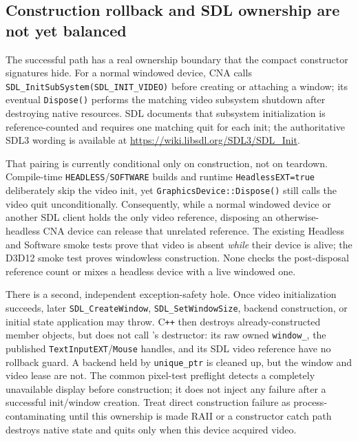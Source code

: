 \subsection{Construction rollback and SDL ownership are not yet balanced}

The successful path has a real ownership boundary that the compact constructor signatures hide.
For a normal windowed device, CNA calls
\texttt{SDL\_Init\allowbreak{}SubSystem(}\allowbreak{}\texttt{SDL\_INIT\_VIDEO)} before
creating or attaching a window; its eventual \texttt{Dispose()} performs the matching video
subsystem shutdown after destroying native resources. SDL documents
that subsystem initialization is reference-counted and requires one matching quit for each init;
the authoritative SDL3 wording is available at
\url{https://wiki.libsdl.org/SDL3/SDL_Init}.

That pairing is currently conditional only on construction, not on teardown. Compile-time
\texttt{HEADLESS}/\texttt{SOFTWARE} builds and runtime \texttt{HeadlessEXT=true} deliberately
skip the video init, yet \texttt{GraphicsDevice::Dispose()} still calls the video quit
unconditionally. Consequently, while a normal windowed device or another SDL client holds the
only video reference, disposing an otherwise-headless CNA device can release that unrelated
reference. The existing Headless and Software smoke tests prove that video is absent \emph{while}
their device is alive; the D3D12 smoke test proves windowless construction. None checks the
post-disposal reference count or mixes a headless device with a live windowed one.

There is a second, independent exception-safety hole. Once video initialization succeeds, later
\texttt{SDL\_CreateWindow}, \texttt{SDL\_SetWindowSize}, backend construction, or initial
state application may throw. C\texttt{++} then destroys already-constructed member objects, but
does not call 's destructor: its raw owned \texttt{window\_}, the
published \texttt{TextInputEXT}/\texttt{Mouse} handles, and its SDL video reference have no
rollback guard. A backend held by \texttt{unique\_ptr} is cleaned up, but the window and video
lease are not. The common pixel-test preflight detects a completely unavailable display before
construction; it does not inject any failure after a successful init/window creation. Treat
direct construction failure as process-contaminating until this ownership is made RAII or a
constructor catch path destroys native state and quits only when this device acquired video.

